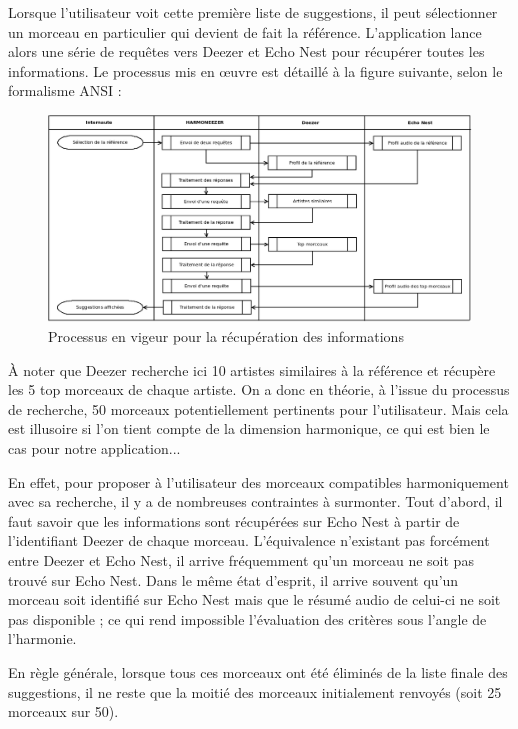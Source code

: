 \documentclass[a4paper,12pt]{article}
\begin{document}
\newpage

Lorsque l'utilisateur voit cette première liste de suggestions, il peut sélectionner un morceau en particulier qui devient de fait la référence. L'application lance alors une série de requêtes vers Deezer et Echo Nest pour récupérer toutes les informations. Le processus mis en œuvre est détaillé à la figure suivante, selon le formalisme ANSI :

\begin{figure}[!h]
  \begin{center}
    \includegraphics[scale=0.3]{processus.png}
    \caption{Processus en vigeur pour la récupération des informations}
  \end{center}
\end{figure}

À noter que Deezer recherche ici 10 artistes similaires à la référence et récupère les 5 top morceaux de chaque artiste. On a donc en théorie, à l'issue du processus de recherche, 50 morceaux potentiellement pertinents pour l'utilisateur. Mais cela est illusoire si l'on tient compte de la dimension harmonique, ce qui est bien le cas pour notre application...

En effet, pour proposer à l'utilisateur des morceaux compatibles harmoniquement avec sa recherche, il y a de nombreuses contraintes à surmonter. Tout d'abord, il faut savoir que les informations sont récupérées sur Echo Nest à partir de l'identifiant Deezer de chaque morceau. L'équivalence n'existant pas forcément entre Deezer et Echo Nest, il arrive fréquemment qu'un morceau ne soit pas trouvé sur Echo Nest. Dans le même état d'esprit, il arrive souvent qu'un morceau soit identifié sur Echo Nest mais que le résumé audio de celui-ci ne soit pas disponible ; ce qui rend impossible l'évaluation des critères sous l'angle de l'harmonie.

En règle générale, lorsque tous ces morceaux ont été éliminés de la liste finale des suggestions, il ne reste que la moitié des morceaux initialement renvoyés (soit 25 morceaux sur 50).
\end{document}
